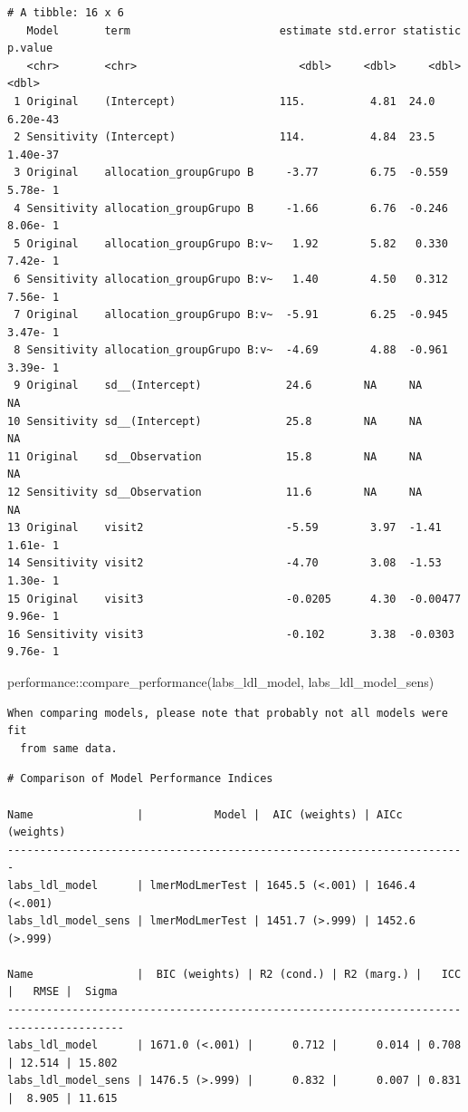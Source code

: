 \documentclass[
  letterpaper,
  DIV=11,
  numbers=noendperiod]{scrartcl}
\newenvironment{Shaded}{\begin{snugshade}}{\end{snugshade}}
\newcommand{\FunctionTok}[1]{\textcolor[rgb]{0.28,0.35,0.67}{#1}}
\newcommand{\NormalTok}[1]{\textcolor[rgb]{0.00,0.23,0.31}{#1}}
\newcommand{\SpecialCharTok}[1]{\textcolor[rgb]{0.37,0.37,0.37}{#1}}
\begin{document}
\begin{verbatim}
# A tibble: 16 x 6
   Model       term                       estimate std.error statistic   p.value
   <chr>       <chr>                         <dbl>     <dbl>     <dbl>     <dbl>
 1 Original    (Intercept)                115.          4.81  24.0      6.20e-43
 2 Sensitivity (Intercept)                114.          4.84  23.5      1.40e-37
 3 Original    allocation_groupGrupo B     -3.77        6.75  -0.559    5.78e- 1
 4 Sensitivity allocation_groupGrupo B     -1.66        6.76  -0.246    8.06e- 1
 5 Original    allocation_groupGrupo B:v~   1.92        5.82   0.330    7.42e- 1
 6 Sensitivity allocation_groupGrupo B:v~   1.40        4.50   0.312    7.56e- 1
 7 Original    allocation_groupGrupo B:v~  -5.91        6.25  -0.945    3.47e- 1
 8 Sensitivity allocation_groupGrupo B:v~  -4.69        4.88  -0.961    3.39e- 1
 9 Original    sd__(Intercept)             24.6        NA     NA       NA       
10 Sensitivity sd__(Intercept)             25.8        NA     NA       NA       
11 Original    sd__Observation             15.8        NA     NA       NA       
12 Sensitivity sd__Observation             11.6        NA     NA       NA       
13 Original    visit2                      -5.59        3.97  -1.41     1.61e- 1
14 Sensitivity visit2                      -4.70        3.08  -1.53     1.30e- 1
15 Original    visit3                      -0.0205      4.30  -0.00477  9.96e- 1
16 Sensitivity visit3                      -0.102       3.38  -0.0303   9.76e- 1
\end{verbatim}

\begin{Shaded}
\begin{Highlighting}[]
\NormalTok{performance}\SpecialCharTok{::}\FunctionTok{compare\_performance}\NormalTok{(labs\_ldl\_model, labs\_ldl\_model\_sens)}
\end{Highlighting}
\end{Shaded}

\begin{verbatim}
When comparing models, please note that probably not all models were fit
  from same data.
\end{verbatim}

\begin{verbatim}
# Comparison of Model Performance Indices

Name                |           Model |  AIC (weights) | AICc (weights)
-----------------------------------------------------------------------
labs_ldl_model      | lmerModLmerTest | 1645.5 (<.001) | 1646.4 (<.001)
labs_ldl_model_sens | lmerModLmerTest | 1451.7 (>.999) | 1452.6 (>.999)

Name                |  BIC (weights) | R2 (cond.) | R2 (marg.) |   ICC |   RMSE |  Sigma
----------------------------------------------------------------------------------------
labs_ldl_model      | 1671.0 (<.001) |      0.712 |      0.014 | 0.708 | 12.514 | 15.802
labs_ldl_model_sens | 1476.5 (>.999) |      0.832 |      0.007 | 0.831 |  8.905 | 11.615
\end{verbatim}
\end{document}
